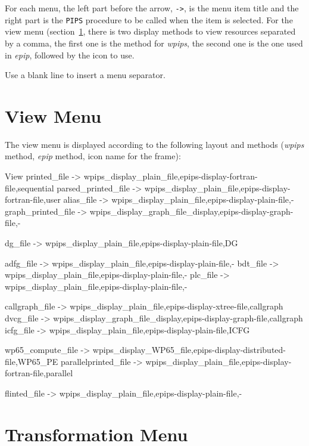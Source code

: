 \documentclass[a4paper]{report}
\newcommand{\Pips}{\texttt{PIPS}}
\newcommand{\EPIPS}{{\em epip}}
\newcommand{\WPIPS}{{\em wpips}}
\begin{document}
For each menu, the left part before the arrow, \verb|->|, is the menu
item title and the right part is the \Pips{} procedure to be called when
the item is selected. For the view menu (section~\ref{sec:view_menu},
there is two display methods to view resources separated by a comma,
the first one is the method for \WPIPS, the second one is the one
used in \EPIPS, followed by the icon to use.

Use a blank line to insert a menu separator.

\section{View Menu}
\label{sec:view_menu}

The view menu is displayed according to the following layout and
methods (\WPIPS{} method, \EPIPS{} method, icon name for the frame):
\begin{PipsMenu}{View}
  printed_file -> wpips_display_plain_file,epips-display-fortran-file,sequential
  parsed_printed_file -> wpips_display_plain_file,epips-display-fortran-file,user
  alias_file -> wpips_display_plain_file,epips-display-plain-file,-
  graph_printed_file -> wpips_display_graph_file_display,epips-display-graph-file,-

  dg_file -> wpips_display_plain_file,epips-display-plain-file,DG

  adfg_file -> wpips_display_plain_file,epips-display-plain-file,-
  bdt_file -> wpips_display_plain_file,epips-display-plain-file,-
  plc_file -> wpips_display_plain_file,epips-display-plain-file,-

  callgraph_file -> wpips_display_plain_file,epips-display-xtree-file,callgraph
  dvcg_file -> wpips_display_graph_file_display,epips-display-graph-file,callgraph
  icfg_file -> wpips_display_plain_file,epips-display-plain-file,ICFG

  wp65_compute_file -> wpips_display_WP65_file,epips-display-distributed-file,WP65_PE
  parallelprinted_file -> wpips_display_plain_file,epips-display-fortran-file,parallel

  flinted_file -> wpips_display_plain_file,epips-display-plain-file,-
\end{PipsMenu}


\section{Transformation Menu}
\label{sec:transformation_menu}
\end{document}
